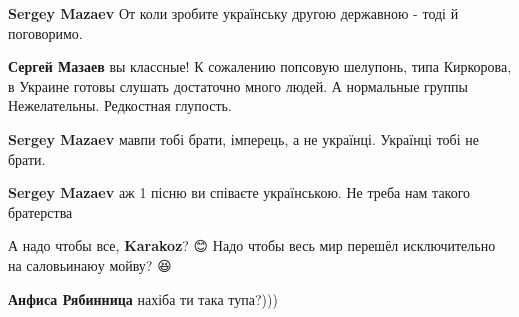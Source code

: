 \begin{itemize}
\begin{itemize}
\begin{itemize}
\textbf{Sergey Mazaev} От коли зробите українську другою державною - тоді й поговоримо.

\end{itemize}

 
\textbf{Сергей Мазаев} вы классные! К сожалению попсовую шелупонь, типа Киркорова, в Украине готовы слушать достаточно много людей. А нормальные группы Нежелательны. Редкостная глупость.

 
\textbf{Sergey Mazaev} мавпи тобі брати, імперець, а не українці. Українці тобі не брати.

 
\textbf{Sergey Mazaev} аж 1 пісню ви співаєте українською. Не треба нам такого братерства

\begin{itemize}
 
А надо чтобы все, \textbf{Karakoz}? 😊
Надо чтобы весь мир перешёл исключительно на саловьинаюу мойву? 😆

 
\textbf{Анфиса Рябинница} нахіба ти така тупа?)))

 

\end{itemize}
\end{itemize}
\end{itemize}
